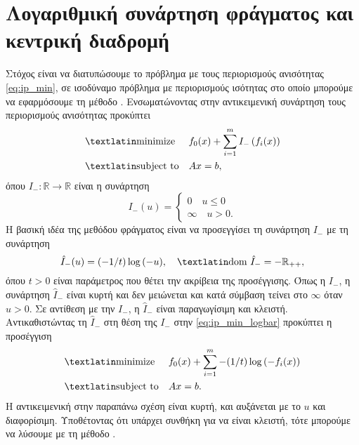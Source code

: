 \section{Λογαριθμική συνάρτηση φράγματος και κεντρική διαδρομή}
Στόχος είναι να διατυπώσουμε το πρόβλημα με τους περιορισμούς ανισότητας
\eqref{eq:ip_min}, σε ισοδύναμο πρόβλημα με περιορισμούς ισότητας στο οποίο
μπορούμε να εφαρμόσουμε τη μέθοδο . Ενσωματώνοντας στην
αντικειμενική συνάρτηση  τους περιορισμούς ανισότητας προκύπτει
\begin{equation}\label{eq:ip_min_logbar}
    \begin{aligned}
        & \text{\tl{minimize}}
        & & f_0(x) + \sum_{i=1}^m I_{-}\left(f_i(x)\right)\\
        & \text{\tl{subject to}}
        & & Ax = b,
    \end{aligned}
\end{equation}
όπου \( I_{-}: \mathbb{R} \to \mathbb{R} \) είναι η συνάρτηση
\begin{equation*}
    I_{-}(u) =
    \begin{cases}
        0 \quad u \leq 0 \\
        \infty \quad u > 0.
    \end{cases}
\end{equation*}
Η βασική ιδέα της μεθόδου φράγματος είναι να προσεγγίσει τη συνάρτηση
\( I_{-} \) με τη συνάρτηση
\begin{equation*}
    \hat{I}_{-}(u) = (-1/t)\log{(-u)}, \quad \text{\tl{dom}}\ \hat{I}_{-} =
    -\mathbb{R}_{++},
\end{equation*}
όπου \( t > 0 \) είναι παράμετρος που θέτει την ακρίβεια της προσέγγισης. Όπως
η \( I_{-} \), η συνάρτηση \( \hat{I}_{-} \) είναι κυρτή και δεν μειώνεται και
κατά σύμβαση τείνει στο \( \infty \) όταν \( u > 0 \). Σε αντίθεση με την \(
I_{-} \), η \( \hat{I}_{-} \) είναι παραγωγίσιμη και κλειστή. Αντικαθιστώντας τη
\( \hat{I}_{-} \) στη θέση της \( I_{-} \) στην \eqref{eq:ip_min_logbar}
προκύπτει η προσέγγιση
\begin{equation}\label{eq:ip_min_logappr}
    \begin{aligned}
        & \text{\tl{minimize}}
        & & f_0(x) + \sum_{i=1}^m -(1/t)\log{(-f_i(x))} \\
        & \text{\tl{subject to}}
        & & Ax = b.
    \end{aligned}
\end{equation}
Η αντικειμενική στην παραπάνω σχέση είναι κυρτή, και αυξάνεται με το
\( u \) και διαφορίσιμη. Υποθέτοντας ότι υπάρχει συνθήκη για να είναι κλειστή,
τότε μπορούμε να λύσουμε με τη μέθοδο .

